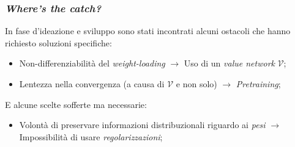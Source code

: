 \documentclass{beamer}
\begin{document}
{%

\begin{frame}
	\frametitle{\textit{Where's the catch?}}
	In fase d'ideazione e sviluppo sono stati incontrati alcuni ostacoli che hanno richiesto soluzioni specifiche:
	\hfill\break

	\begin{itemize}
		\item Non-differenziabilità del \textit{weight-loading} $\rightarrow$ Uso di un \textit{value network} $\mathcal{V}$;
		\item Lentezza nella convergenza (a causa di $\mathcal{V}$ e non solo) $\rightarrow$ \textit{Pretraining};
	\end{itemize}
	\hfill\break

	E alcune scelte sofferte ma necessarie:
	\hfill\break

	\begin{itemize}
		\item Volontà di preservare informazioni distribuzionali riguardo ai \textit{pesi} $\rightarrow$ Impossibilità di usare \textit{regolarizzazioni};
	\end{itemize}
	\hfill\break


\end{frame}

}



\end{document}
